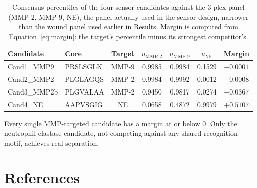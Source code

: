 \documentclass[10pt,a4paper]{article}
\numberwithin{equation}{section}
\begin{document}
\begin{table}[H]
\centering
\footnotesize\renewcommand{\arraystretch}{1.25}
\begin{tabular}{@{}llccccc@{}}
\toprule
Candidate & Core & Target & $u_{\text{MMP-2}}$ & $u_{\text{MMP-9}}$ & $u_{\text{NE}}$ & Margin \\
\midrule
Cand1\_MMP9 & PRSLSGLK & MMP-9 & 0.9985 & 0.9984 & 0.1529 & $-0.0001$ \\
Cand2\_MMP2 & PLGLAGQS & MMP-2 & 0.9984 & 0.9992 & 0.0012 & $-0.0008$ \\
Cand3\_MMP2b & PLGVALAA & MMP-2 & 0.9450 & 0.9817 & 0.0274 & $-0.0367$ \\
Cand4\_NE & AAPVSGIG & NE & 0.0658 & 0.4872 & 0.9979 & $+0.5107$ \\
\bottomrule
\end{tabular}
\caption{Consensus percentiles of the four sensor candidates against the 3-plex panel (MMP-2, MMP-9, NE), the panel actually used in the sensor design, narrower than the wound panel used earlier in Results. Margin is computed from Equation~\ref{eq:margin}: the target's percentile minus its strongest competitor's.}
\label{tab:candidates}
\end{table}

Every single MMP-targeted candidate has a margin at or below 0. Only the neutrophil elastase candidate, not competing against any shared recognition motif, achieves real separation.

\section*{References}
\end{document}
